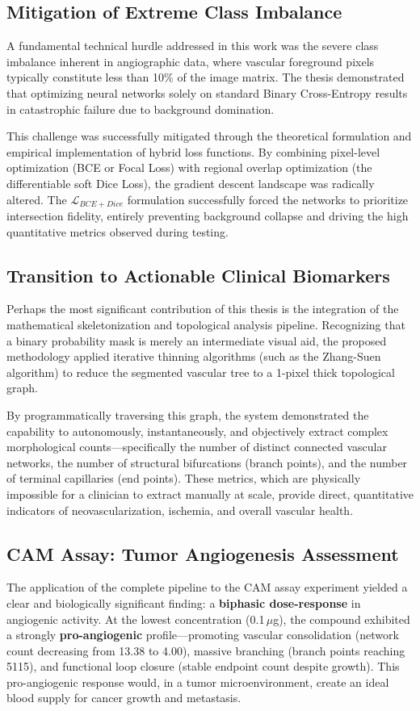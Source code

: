 \subsection{Mitigation of Extreme Class Imbalance}
A fundamental technical hurdle addressed in this work was the severe class imbalance inherent in angiographic data, where vascular foreground pixels typically constitute less than 10\% of the image matrix. The thesis demonstrated that optimizing neural networks solely on standard Binary Cross-Entropy results in catastrophic failure due to background domination.

This challenge was successfully mitigated through the theoretical formulation and empirical implementation of hybrid loss functions. By combining pixel-level optimization (BCE or Focal Loss) with regional overlap optimization (the differentiable soft Dice Loss), the gradient descent landscape was radically altered. The $\mathcal{L}_{BCE+Dice}$ formulation successfully forced the networks to prioritize intersection fidelity, entirely preventing background collapse and driving the high quantitative metrics observed during testing.

\subsection{Transition to Actionable Clinical Biomarkers}
Perhaps the most significant contribution of this thesis is the integration of the mathematical skeletonization and topological analysis pipeline. Recognizing that a binary probability mask is merely an intermediate visual aid, the proposed methodology applied iterative thinning algorithms (such as the Zhang-Suen algorithm) to reduce the segmented vascular tree to a 1-pixel thick topological graph.

By programmatically traversing this graph, the system demonstrated the capability to autonomously, instantaneously, and objectively extract complex morphological counts---specifically the number of distinct connected vascular networks, the number of structural bifurcations (branch points), and the number of terminal capillaries (end points). These metrics, which are physically impossible for a clinician to extract manually at scale, provide direct, quantitative indicators of neovascularization, ischemia, and overall vascular health.

\subsection{CAM Assay: Tumor Angiogenesis Assessment}
The application of the complete pipeline to the CAM assay experiment yielded a clear and biologically significant finding: a \textbf{biphasic dose-response} in angiogenic activity. At the lowest concentration (0.1\,$\mu$g), the compound exhibited a strongly \textbf{pro-angiogenic} profile---promoting vascular consolidation (network count decreasing from 13.38 to 4.00), massive branching (branch points reaching 5115), and functional loop closure (stable endpoint count despite growth). This pro-angiogenic response would, in a tumor microenvironment, create an ideal blood supply for cancer growth and metastasis.


